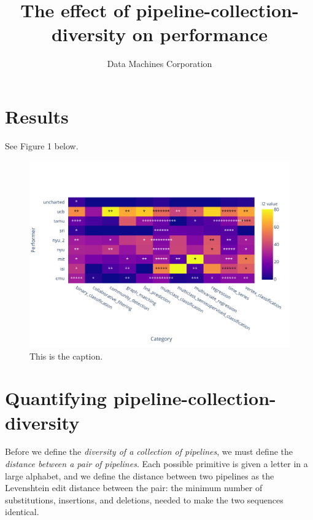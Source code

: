 \documentclass{article}
\title{The effect of pipeline-collection-diversity on performance}
\author{Data Machines Corporation}
\begin{document}
\maketitle


\section{Results}
See Figure 1 below.
\begin{figure}
\includegraphics{heatmap.pdf}
\caption{This is the caption.}
\end{figure}

\section{Quantifying pipeline-collection-diversity}
  Before we define the \emph{diversity of a collection of pipelines},
  we must define the \emph{distance between a pair of pipelines}.
  Each possible primitive is given a letter in a large alphabet, and
  we define the distance between two pipelines as the Levenshtein edit
  distance between the pair: the minimum number of substitutions,
  insertions, and deletions, needed to make the two sequences
  identical.
\end{document}
